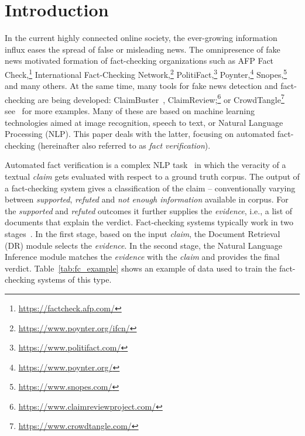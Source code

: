 \section{Introduction}\label{sec:intro}

In the current highly connected online society, the ever-growing information influx eases the spread of false or misleading news.
The omnipresence of fake news motivated formation of fact-checking organizations such as AFP Fact Check,\footnote{\url{https://factcheck.afp.com/}} International Fact-Checking Network,\footnote{\url{https://www.poynter.org/ifcn/}} PolitiFact,\footnote{\url{https://www.politifact.com/}} Poynter,\footnote{\url{https://www.poynter.org/}} Snopes,\footnote{\url{https://www.snopes.com/}} and many others.
At the same time, many tools for fake news detection and fact-checking are being developed: ClaimBuster~\cite{hassan2017claimbuster}, ClaimReview;\footnote{\url{https://www.claimreviewproject.com/}} or CrowdTangle\footnote{\url{https://www.crowdtangle.com/}} see~\cite{zeng2021fcsurvey} for more examples.
Many of these are based on machine learning technologies aimed at image recognition, speech to text, or Natural Language Processing (NLP).
This paper deals with the latter, focusing on automated fact-checking (hereinafter also referred to as \textit{fact verification}).

Automated fact verification is a complex NLP task~\cite{thorne2018automated} in which the veracity of a textual \textit{claim} gets evaluated with respect to a ground truth corpus.
The output of a fact-checking system gives a classification of the claim -- conventionally varying between \textit{supported}, \textit{refuted} and \textit{not enough information} available in corpus. 
For the \textit{supported} and \textit{refuted} outcomes it further supplies the \textit{evidence}, i.e., a list of documents that explain the verdict.
Fact-checking systems typically work in two stages~\cite{fever2018}. 
In the first stage, based on the input \textit{claim}, the Document Retrieval (DR) module selects the \textit{evidence}.
In the second stage, the Natural Language Inference module matches the \textit{evidence} with the \textit{claim} and provides the final verdict.    
Table~\ref{tab:fc_example} shows an example of data used to train the fact-checking systems of this type.

